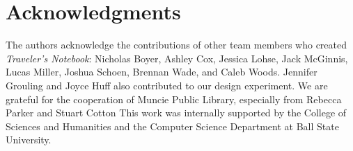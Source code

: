 \documentclass[a4paper]{article}
\begin{document}
\section{Acknowledgments}
The authors acknowledge the contributions of other team members who
created \textit{Traveler's Notebook}: 
Nicholas Boyer,
Ashley Cox,
Jessica Lohse,
Jack McGinnis,
Lucas Miller,
Joshua Schoen,
Brennan Wade,
and Caleb Woods.
Jennifer Grouling and Joyce Huff also contributed to our design experiment.
We are grateful for the cooperation of Muncie Public Library, especially
from Rebecca Parker and Stuart Cotton 
This work was internally supported by the College of Sciences and
Humanities and the Computer Science Department at Ball State University.



\end{document}
